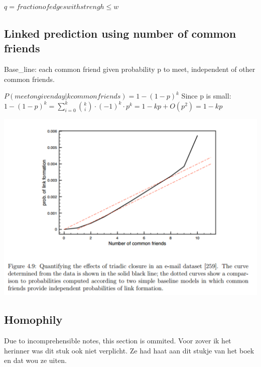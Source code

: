 \documentclass[12pt]{scrartcl}
\begin{document}

$q = fraction of edges with strengh \leq w$

\subsection{Linked prediction using number of common friends}
Base\_line: each common friend given probability p to meet, independent of other common friends.\newline

\noindent$P(meet on given day | k common friends) = 1 - (1-p)^k$ \newline
Since p is small: $1 - (1-p)^k = \sum_{i=0}^{k} \binom{k}{i} \cdot (-1)^k \cdot p^k = 1 - kp + O(p^2) = 1 - kp$

\begin{minipage}{0.3\textwidth}	
	\includegraphics[scale=0.4]{./images/figure49.pdf}
\end{minipage}

\subsection{Homophily}
Due to incomprehensible notes, this section is ommited. Voor zover ik het herinner was dit stuk ook niet verplicht. Ze had haat aan dit stukje van het boek en dat wou ze uiten.
\end{document}
